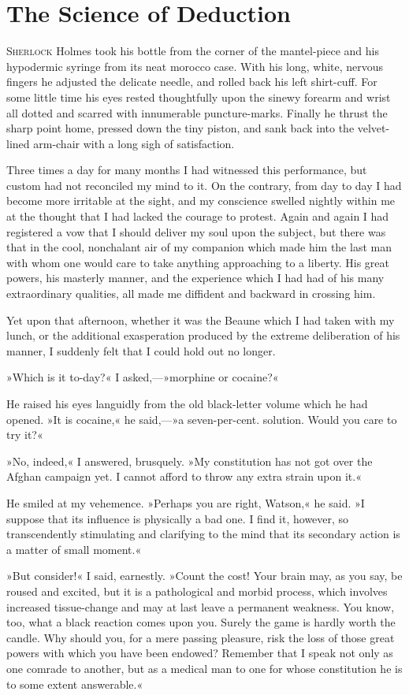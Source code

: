 \chapter{The Science of Deduction}
\lettrine[lines=4]{S}{herlock}  Holmes took his bottle from the corner of the mantel-piece and his hypodermic syringe from its neat morocco case. With his long, white, nervous fingers he adjusted the delicate needle, and rolled back his left shirt-cuff. For some little time his eyes rested thoughtfully upon the sinewy forearm and wrist all dotted and scarred with innumerable puncture-marks. Finally he thrust the sharp point home, pressed down the tiny piston, and sank back into the velvet-lined arm-chair with a long sigh of satisfaction.

Three times a day for many months I had witnessed this performance, but custom had not reconciled my mind to it. On the contrary, from day to day I had become more irritable at the sight, and my conscience swelled nightly within me at the thought that I had lacked the courage to protest. Again and again I had registered a vow that I should deliver my soul upon the subject, but there was that in the cool, nonchalant air of my companion which made him the last man with whom one would care to take anything approaching to a liberty. His great powers, his masterly manner, and the experience which I had had of his many extraordinary qualities, all made me diffident and backward in crossing him.

Yet upon that afternoon, whether it was the Beaune which I had taken with my lunch, or the additional exasperation produced by the extreme deliberation of his manner, I suddenly felt that I could hold out no longer.

»Which is it to-day?« I asked,—»morphine or cocaine?«

He raised his eyes languidly from the old black-letter volume which he had opened. »It is cocaine,« he said,—»a seven-per-cent. solution. Would you care to try it?«

»No, indeed,« I answered, brusquely. »My constitution has not got over the Afghan campaign yet. I cannot afford to throw any extra strain upon it.«

He smiled at my vehemence. »Perhaps you are right, Watson,« he said. »I suppose that its influence is physically a bad one. I find it, however, so transcendently stimulating and clarifying to the mind that its secondary action is a matter of small moment.«

»But consider!« I said, earnestly. »Count the cost! Your brain may, as you say, be roused and excited, but it is a pathological and morbid process, which involves increased tissue-change and may at last leave a permanent weakness. You know, too, what a black reaction comes upon you. Surely the game is hardly worth the candle. Why should you, for a mere passing pleasure, risk the loss of those great powers with which you have been endowed? Remember that I speak not only as one comrade to another, but as a medical man to one for whose constitution he is to some extent answerable.«

